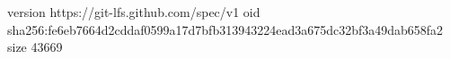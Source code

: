 version https://git-lfs.github.com/spec/v1
oid sha256:fe6eb7664d2cddaf0599a17d7bfb313943224ead3a675dc32bf3a49dab658fa2
size 43669
